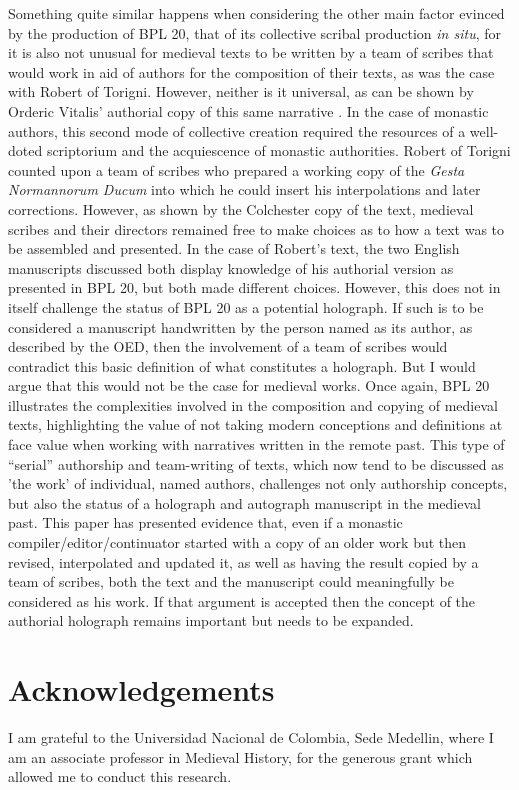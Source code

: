 \documentclass{article}
\begin{document}
Something quite similar happens when considering the other main factor
evinced by the production of BPL 20, that of its collective scribal
production \emph{in situ}, for it is also not unusual for medieval texts
to be written by a team of scribes that would work in aid of authors for
the composition of their texts, as was the case with Robert of Torigni.
However, neither is it universal, as can be shown by Orderic Vitalis'
authorial copy of this same narrative \parencite[ciii]{van_houts_gesta_1992}.
In the case of monastic authors, this second mode of collective creation
required the resources of a well-doted scriptorium and the acquiescence
of monastic authorities. Robert of Torigni counted upon a team of
scribes who prepared a working copy of the \emph{Gesta Normannorum
Ducum} into which he could insert his interpolations and later
corrections. However, as shown by the Colchester copy of the text,
medieval scribes and their directors remained free to make choices as to
how a text was to be assembled and presented. In the case of Robert's
text, the two English manuscripts discussed both display knowledge of
his authorial version as presented in BPL 20, but both made different
choices. However, this does not in itself challenge the status of BPL 20
as a potential holograph. If such is to be considered a manuscript
handwritten by the person named as its author, as described by the OED,
then the involvement of a team of scribes would contradict this basic
definition of what constitutes a holograph. But I would argue that this
would not be the case for medieval works. Once again, BPL 20 illustrates
the complexities involved in the composition and copying of medieval
texts, highlighting the value of not taking modern conceptions and
definitions at face value when working with narratives written in the
remote past. This type of ``serial'' authorship and team-writing of texts,
which now tend to be discussed as 'the work' of individual, named
authors, challenges not only authorship concepts, but also the status of
a holograph and autograph manuscript in the medieval past. This paper
has presented evidence that, even if a monastic
compiler/editor/continuator started with a copy of an older work but
then revised, interpolated and updated it, as well as having the result
copied by a team of scribes, both the text and the manuscript could
meaningfully be considered as his work. If that argument is accepted
then the concept of the authorial holograph remains important but needs
to be expanded.



\section*{Acknowledgements}
I am grateful to the Universidad  Nacional de Colombia, Sede Medellin, where I am an associate professor in Medieval History, for the generous grant which allowed me to conduct this research.

\begin{flushleft}
    \renewcommand*{\mkbibnamefamily}[1]{\textsc{#1}}
    \renewcommand*{\mkbibnamegiven}[1]{\textsc{#1}} 
\printbibliography
\end{flushleft}
\end{document}

